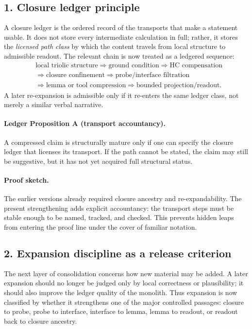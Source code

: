 \subsection*{1. Closure ledger principle}
A closure ledger is the ordered record of the transports that make a statement
usable. It does not store every intermediate calculation in full; rather, it
stores the \emph{licensed path class} by which the content travels from local
structure to admissible readout. The relevant chain is now treated as a ledgered
sequence:
\[
\begin{aligned}
&\text{local triolic structure} \Longrightarrow \text{ground condition} \Longrightarrow \text{HC compensation}\\
&\Longrightarrow \text{closure confinement} \Longrightarrow \text{probe/interface filtration}\\
&\Longrightarrow \text{lemma or tool compression} \Longrightarrow \text{bounded projection/readout}.
\end{aligned}
\]
A later re-expansion is admissible only if it re-enters the same ledger class,
not merely a similar verbal narrative.

\paragraph{Ledger Proposition A (transport accountancy).}
A compressed claim is structurally mature only if one can specify the closure
ledger that licenses its transport. If the path cannot be stated, the claim may
still be suggestive, but it has not yet acquired full structural status.

\paragraph{Proof sketch.}
The earlier versions already required closure ancestry and re-expandability. The
present strengthening adds explicit accountancy: the transport steps must be
stable enough to be named, tracked, and checked. This prevents hidden leaps from
entering the proof line under the cover of familiar notation.

\subsection*{2. Expansion discipline as a release criterion}
The next layer of consolidation concerns how new material may be added. A later
expansion should no longer be judged only by local correctness or plausibility;
it should also improve the ledger quality of the monolith. Thus expansion is now
classified by whether it strengthens one of the major controlled passages:
closure to probe, probe to interface, interface to lemma, lemma to readout, or
readout back to closure ancestry.

